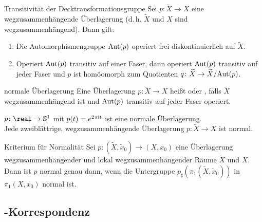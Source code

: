 \linie

\begin{Satz}{Transitivität der Decktransformationsgruppe}
    Sei $p\colon \widetilde{X} \rightarrow X$ eine
    wegzusammenhängende Überlagerung (d.\,h. $\widetilde{X}$ und $X$ sind
    wegzusammenhängend). Dann gilt:
    \begin{enumerate}
        \item
        Die Automorphismengruppe $\text{Aut}(p)$ operiert frei diskontinuierlich auf
        $\widetilde{X}$.

        \item
        Operiert $\text{Aut}(p)$ transitiv auf einer Faser, dann operiert
        $\text{Aut}(p)$ transitiv auf jeder Faser und $p$ ist homöomorph zum
        Quotienten $q\colon \widetilde{X} \rightarrow \widetilde{X}/\text{Aut}(p)$.
    \end{enumerate}
\end{Satz}

\linie

\begin{Def}{normale Überlagerung}
    Eine Überlagerung $p\colon \widetilde{X} \rightarrow X$ heißt
     oder , falls $\widetilde{X}$
    wegzusammenhängend ist und $\text{Aut}(p)$ transitiv auf jeder Faser operiert.
\end{Def}

\begin{Bsp}
    $p\colon \real \rightarrow \sphere^1$ mit $p(t) = e^{2\pi\mathrm{i} t}$ ist eine
    normale Überlagerung. \\
    Jede zweiblättrige, wegzusammenhängende Überlagerung
    $p\colon \widetilde{X} \rightarrow X$ ist normal.
\end{Bsp}

\begin{Satz}{Kriterium für Normalität}
    Sei $p\colon (\widetilde{X}, \widetilde{x}_0) \rightarrow (X, x_0)$ eine
    Überlagerung wegzusammenhängender und lokal wegzusammenhängender Räume
    $\widetilde{X}$ und $X$. \\
    Dann ist $p$ normal genau dann, wenn die Untergruppe
    $p_\sharp(\pi_1(\widetilde{X}, \widetilde{x}_0))$ in $\pi_1(X, x_0)$
    normal ist.
\end{Satz}

\pagebreak

\subsection{%
    -Korrespondenz%
}

